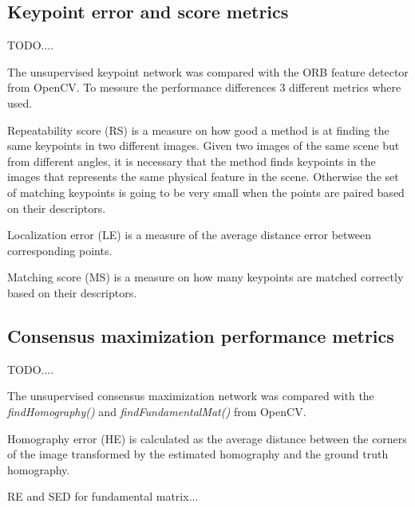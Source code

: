 \subsection{Keypoint error and score metrics}

TODO....

The unsupervised keypoint network was compared with the ORB feature detector from OpenCV. To messure the performance differences 3 different metrics where used.

Repeatability score (RS) is a measure on how good a method is at finding the same keypoints in two different images. Given two images of the same scene but from different angles, it is necessary that the method finds keypoints in the images that represents the same physical feature in the scene. Otherwise the set of matching keypoints is going to be very small when the points are paired based on their descriptors.

Localization error (LE) is a measure of the average distance error between corresponding points.

Matching score (MS) is a measure on how many keypoints are matched correctly based on their descriptors.

\subsection{Consensus maximization performance metrics}

TODO....

The unsupervised consensus maximization network was compared with the \textit{findHomography()} and \textit{findFundamentalMat()} from OpenCV.

Homography error (HE) is calculated as the average distance between the corners of the image transformed by the estimated homography and the ground truth homography.

RE and SED for fundamental matrix...
